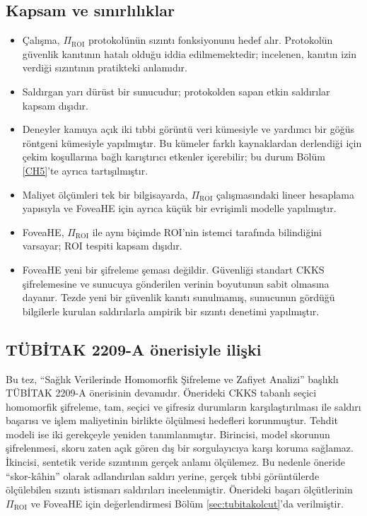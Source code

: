 \subsection{Kapsam ve sınırlılıklar}\label{kapsam}

\begin{itemize}
\item Çalışma, $\Pi_{\mathrm{ROI}}$ protokolünün sızıntı fonksiyonunu hedef alır. Protokolün güvenlik kanıtının hatalı olduğu iddia edilmemektedir; incelenen, kanıtın izin verdiği sızıntının pratikteki anlamıdır.
\item Saldırgan yarı dürüst bir sunucudur; protokolden sapan etkin saldırılar kapsam dışıdır.
\item Deneyler kamuya açık iki tıbbi görüntü veri kümesiyle ve yardımcı bir göğüs röntgeni kümesiyle yapılmıştır. Bu kümeler farklı kaynaklardan derlendiği için çekim koşullarına bağlı karıştırıcı etkenler içerebilir; bu durum Bölüm \ref{CH5}'te ayrıca tartışılmıştır.
\item Maliyet ölçümleri tek bir bilgisayarda, $\Pi_{\mathrm{ROI}}$ çalışmasındaki lineer hesaplama yapısıyla ve FoveaHE için ayrıca küçük bir evrişimli modelle yapılmıştır.
\item FoveaHE, $\Pi_{\mathrm{ROI}}$ ile aynı biçimde ROI'nin istemci tarafında bilindiğini varsayar; ROI tespiti kapsam dışıdır.
\item FoveaHE yeni bir şifreleme şeması değildir. Güvenliği standart CKKS şifrelemesine ve sunucuya gönderilen verinin boyutunun sabit olmasına dayanır. Tezde yeni bir güvenlik kanıtı sunulmamış, sunucunun gördüğü bilgilerle kurulan saldırılarla ampirik bir sızıntı denetimi yapılmıştır.
\end{itemize}

\subsection{TÜBİTAK 2209-A önerisiyle ilişki}\label{tubitak}

Bu tez, ``Sağlık Verilerinde Homomorfik Şifreleme ve Zafiyet Analizi'' başlıklı TÜBİTAK 2209-A önerisinin devamıdır. Önerideki CKKS tabanlı seçici homomorfik şifreleme, tam, seçici ve şifresiz durumların karşılaştırılması ile saldırı başarısı ve işlem maliyetinin birlikte ölçülmesi hedefleri korunmuştur. Tehdit modeli ise iki gerekçeyle yeniden tanımlanmıştır. Birincisi, model skorunun şifrelenmesi, skoru zaten açık gören dış bir sorgulayıcıya karşı koruma sağlamaz. İkincisi, sentetik veride sızıntının gerçek anlamı ölçülemez. Bu nedenle öneride ``skor-kâhin'' olarak adlandırılan saldırı yerine, gerçek tıbbi görüntülerde ölçülebilen sızıntı istismarı saldırıları incelenmiştir. Önerideki başarı ölçütlerinin $\Pi_{\mathrm{ROI}}$ ve FoveaHE için değerlendirmesi Bölüm \ref{sec:tubitakolcut}'da verilmiştir.

